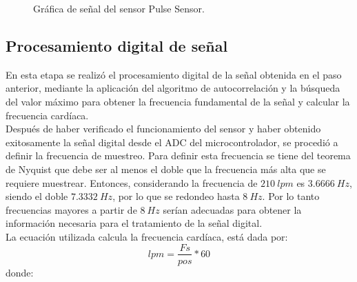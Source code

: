 	\begin{figure}[htbp!]
		\centering
		\caption{Gráfica de señal del sensor Pulse Sensor.}
		\label{fig:GraficaPulseSensor}
	\end{figure}
	
\subsection{Procesamiento digital de señal}
En esta etapa se realizó el procesamiento digital de la señal obtenida en el paso anterior, mediante la aplicación del algoritmo de autocorrelación y la búsqueda del valor máximo para obtener la frecuencia fundamental de la señal y calcular la frecuencia cardíaca.\\

Después de haber verificado el funcionamiento del sensor y haber obtenido exitosamente la señal digital desde el ADC del microcontrolador, se procedió a definir la frecuencia de muestreo. Para definir esta frecuencia se tiene del teorema de Nyquist que debe ser al menos el doble que la frecuencia más alta que se requiere muestrear. Entonces, considerando la frecuencia de $210\ lpm$ es $3.6666\ Hz$, siendo el doble $7.3332\ Hz$, por lo que se redondeo hasta $8\ Hz$. Por lo tanto frecuencias mayores a partir de $8\ Hz$ serían adecuadas para obtener la información necesaria para el tratamiento de la señal digital.\\

La ecuación utilizada calcula la frecuencia cardíaca, está dada por:
$$lpm = \frac{Fs}{pos} * 60$$
donde:

